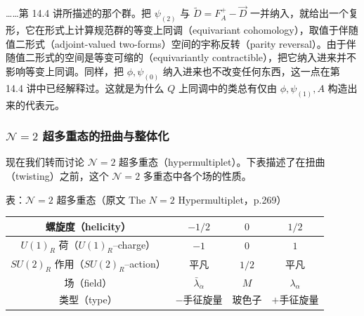 

……第 14.4 讲所描述的那个群。把 $\psi_{(2)}$ 与 $\widetilde D=F_A^+-\vec D$ 一并纳入，就给出一个复形，它在形式上计算规范群的等变上同调（equivariant cohomology），取值于伴随值二形式（adjoint-valued two-forms）空间的宇称反转（parity reversal）。由于伴随值二形式的空间是等变可缩的（equivariantly contractible），把它纳入进来并不影响等变上同调。同样，把 $\phi,\psi_{(0)}$ 纳入进来也不改变任何东西，这一点在第 14.4 讲中已经解释过。这就是为什么 $Q$ 上同调中的类总有仅由 $\phi,\psi_{(1)},A$ 构造出来的代表元。

\subsubsection{$\mathcal{N}=2$ 超多重态的扭曲与整体化}

现在我们转而讨论 $\mathcal{N}=2$ 超多重态（hypermultiplet）。下表描述了在扭曲（twisting）之前，这个 $\mathcal{N}=2$ 多重态中各个场的性质。

\begin{center}
表：$\mathcal{N}=2$ 超多重态（原文 The $N=2$ Hypermultiplet，p.269）\\[3pt]
\begin{tabular}{|c|c|c|c|}
\hline
螺旋度（helicity） & $-1/2$ & $0$ & $1/2$\\
\hline
$U(1)_R$ 荷（$U(1)_R$--charge） & $-1$ & $0$ & $1$\\
\hline
$SU(2)_R$ 作用（$SU(2)_R$--action） & 平凡 & $1/2$ & 平凡\\
\hline
场（field） & $\bar\lambda_{\dot\alpha}$ & $M$ & $\lambda_\alpha$\\
\hline
类型（type） & $-$手征旋量 & 玻色子 & $+$手征旋量\\
\hline
\end{tabular}
\end{center}


